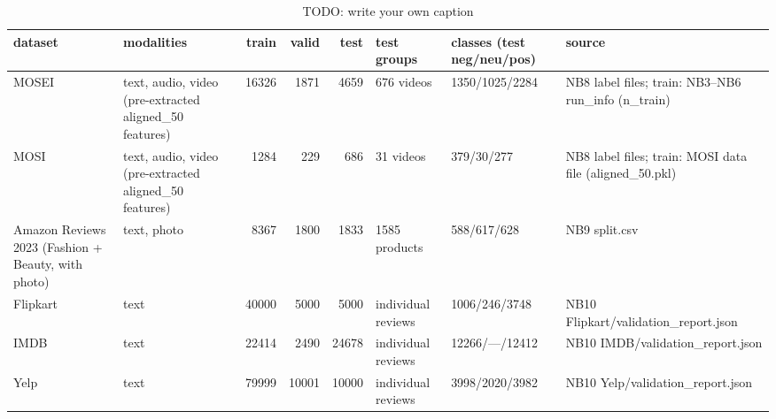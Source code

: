 \begin{table}
\caption{TODO: write your own caption}\label{tab:R01-dataset-sizes}
\scriptsize
\begin{tabularx}{\textheight}{>{\raggedright\arraybackslash}X>{\raggedright\arraybackslash}Xrrrll>{\raggedright\arraybackslash}X}
\toprule
dataset & modalities & train & valid & test & test groups & classes (test neg/\allowbreak{}neu/\allowbreak{}pos) & source \\
\midrule
MOSEI & text, audio, video (pre-extracted aligned\_\allowbreak{}50 features) & 16326 & 1871 & 4659 & 676 videos & 1350/\allowbreak{}1025/\allowbreak{}2284 & NB8 label files; train: NB3--NB6 run\_\allowbreak{}info (n\_\allowbreak{}train) \\
MOSI & text, audio, video (pre-extracted aligned\_\allowbreak{}50 features) & 1284 & 229 & 686 & 31 videos & 379/\allowbreak{}30/\allowbreak{}277 & NB8 label files; train: MOSI data file (aligned\_\allowbreak{}50.pkl) \\
Amazon Reviews 2023 (Fashion + Beauty, with photo) & text, photo & 8367 & 1800 & 1833 & 1585 products & 588/\allowbreak{}617/\allowbreak{}628 & NB9 split.csv \\
Flipkart & text & 40000 & 5000 & 5000 & individual reviews & 1006/\allowbreak{}246/\allowbreak{}3748 & NB10 Flipkart/\allowbreak{}validation\_\allowbreak{}report.json \\
IMDB & text & 22414 & 2490 & 24678 & individual reviews & 12266/\allowbreak{}—/\allowbreak{}12412 & NB10 IMDB/\allowbreak{}validation\_\allowbreak{}report.json \\
Yelp & text & 79999 & 10001 & 10000 & individual reviews & 3998/\allowbreak{}2020/\allowbreak{}3982 & NB10 Yelp/\allowbreak{}validation\_\allowbreak{}report.json \\
\bottomrule
\end{tabularx}
\end{table}
